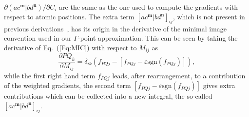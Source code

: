 \documentclass[prl,twocolumn,showpacs,twocolumngrid,superbib]{revtex4}
\begin{document}
$\partial (ac^\mathbf{m}|bd^\mathbf{n})/\partial C_{i}$ are the same
as the one used to compute the gradients with respect to atomic positions. The extra term 
$[ac^\mathbf{m}|bd^\mathbf{n}]_{ij}$, which is not present in 
previous derivations~\cite{MTobita03,KKudin00B,KDoll04}, 
has its origin in the derivative of the minimal image convention used in 
our $\Gamma$-point approximation. 
This can be seen by taking the derivative of Eq.~(\ref{Eq:MIC}) with respect to $M_{ij}$ as
\begin{equation*}
  \frac{\partial PQ_k}{\partial M_{ij}}=\delta_{ik}(f_{PQj}-[f_{PQj}-\varepsilon\mathrm{sgn}(f_{PQj})]),
\end{equation*}
while the first right hand term $f_{PQj}$ leads, after rearrangement, 
to a contribution of the weighted gradients, 
the second term $[f_{PQj}-\varepsilon \mathrm{sgn}(f_{PQj})]$
gives extra contributions which can be collected into a new integral, the so-called
$[ac^\mathbf{m}|bd^\mathbf{n}]_{ij}$.

\end{document}
